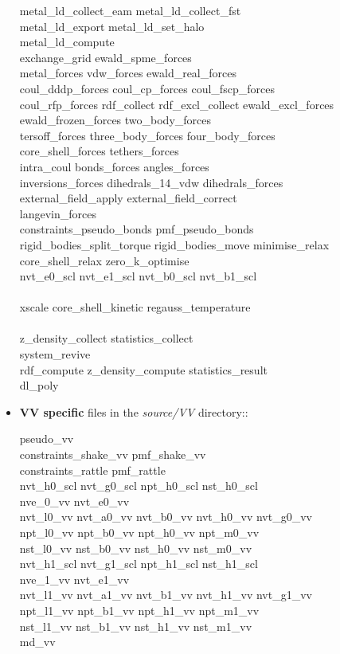 \begin{itemize}
{metal\_ld\_collect\_eam metal\_ld\_collect\_fst \\
metal\_ld\_export metal\_ld\_set\_halo \\
metal\_ld\_compute \\
exchange\_grid ewald\_spme\_forces \\
metal\_forces vdw\_forces ewald\_real\_forces \\
coul\_dddp\_forces coul\_cp\_forces coul\_fscp\_forces \\
coul\_rfp\_forces rdf\_collect rdf\_excl\_collect ewald\_excl\_forces \\
ewald\_frozen\_forces two\_body\_forces \\
tersoff\_forces three\_body\_forces four\_body\_forces \\
core\_shell\_forces tethers\_forces \\
intra\_coul bonds\_forces angles\_forces \\
inversions\_forces dihedrals\_14\_vdw dihedrals\_forces \\
external\_field\_apply external\_field\_correct \\
langevin\_forces \\
constraints\_pseudo\_bonds pmf\_pseudo\_bonds \\
rigid\_bodies\_split\_torque rigid\_bodies\_move minimise\_relax \\
core\_shell\_relax zero\_k\_optimise \\
nvt\_e0\_scl nvt\_e1\_scl nvt\_b0\_scl nvt\_b1\_scl \\
\\
xscale core\_shell\_kinetic regauss\_temperature \\
\\
z\_density\_collect statistics\_collect \\
system\_revive \\
rdf\_compute z\_density\_compute statistics\_result \\
dl\_poly}

\item {\bf VV specific} files in the {\em source/VV} directory::

{\sc
pseudo\_vv \\
constraints\_shake\_vv pmf\_shake\_vv \\
constraints\_rattle pmf\_rattle \\
nvt\_h0\_scl nvt\_g0\_scl npt\_h0\_scl nst\_h0\_scl \\
nve\_0\_vv  nvt\_e0\_vv \\
nvt\_l0\_vv nvt\_a0\_vv nvt\_b0\_vv nvt\_h0\_vv nvt\_g0\_vv \\
npt\_l0\_vv npt\_b0\_vv npt\_h0\_vv npt\_m0\_vv \\
nst\_l0\_vv nst\_b0\_vv nst\_h0\_vv nst\_m0\_vv \\
nvt\_h1\_scl nvt\_g1\_scl npt\_h1\_scl nst\_h1\_scl \\
nve\_1\_vv  nvt\_e1\_vv \\
nvt\_l1\_vv nvt\_a1\_vv nvt\_b1\_vv nvt\_h1\_vv nvt\_g1\_vv \\
npt\_l1\_vv npt\_b1\_vv npt\_h1\_vv npt\_m1\_vv \\
nst\_l1\_vv nst\_b1\_vv nst\_h1\_vv nst\_m1\_vv \\
md\_vv}


\end{itemize}
